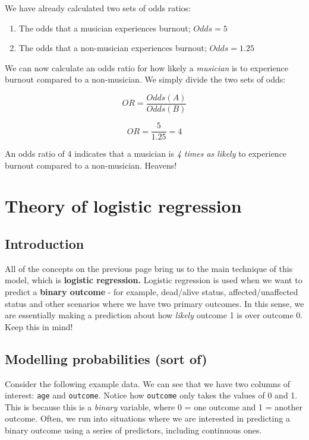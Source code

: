 \documentclass[
]{book}
\providecommand{\tightlist}{%
  \setlength{\itemsep}{0pt}\setlength{\parskip}{0pt}}
\begin{document}
We have already calculated two sets of odds ratios:

\begin{enumerate}
\def\labelenumi{\alph{enumi})}
\tightlist
\item
  The odds that a musician experiences burnout; \(Odds = 5\)
\item
  The odds that a non-musician experiences burnout; \(Odds = 1.25\)
\end{enumerate}

We can now calculate an odds ratio for how likely a \emph{musician} is to experience burnout compared to a non-musician. We simply divide the two sets of odds:

\[
OR = \frac{Odds(A)}{Odds(B)}
\]

\[
OR = \frac{5}{1.25} = 4
\]

An odds ratio of 4 indicates that a musician is \emph{4 times as likely} to experience burnout compared to a non-musician. Heavens!

\section{Theory of logistic regression}\label{theory-of-logistic-regression}

\subsection{Introduction}\label{introduction-5}

All of the concepts on the previous page bring us to the main technique of this model, which is \textbf{logistic regression.} Logistic regression is used when we want to predict a \textbf{binary outcome} - for example, dead/alive status, affected/unaffected status and other scenarios where we have two primary outcomes. In this sense, we are essentially making a prediction about how \emph{likely} outcome 1 is over outcome 0. Keep this in mind!

\subsection{Modelling probabilities (sort of)}\label{modelling-probabilities-sort-of}

Consider the following example data. We can see that we have two columns of interest: \texttt{age} and \texttt{outcome}. Notice how \texttt{outcome} only takes the values of 0 and 1. This is because this is a \emph{binary} variable, where 0 = one outcome and 1 = another outcome. Often, we run into situations where we are interested in predicting a binary outcome using a series of predictors, including continuous ones.
\end{document}
